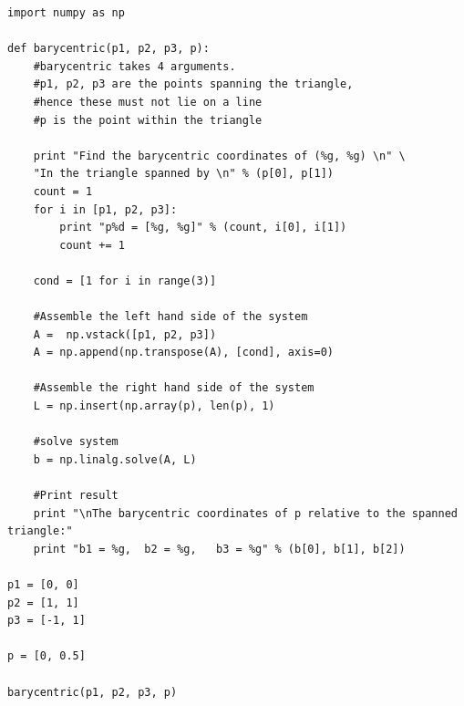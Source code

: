 \documentclass[a4paper,norsk]{article}
\begin{document}
\begin{lstlisting}[style=python]
import numpy as np

def barycentric(p1, p2, p3, p):
    #barycentric takes 4 arguments.
    #p1, p2, p3 are the points spanning the triangle, 
    #hence these must not lie on a line
    #p is the point within the triangle

    print "Find the barycentric coordinates of (%g, %g) \n" \
    "In the triangle spanned by \n" % (p[0], p[1])
    count = 1
    for i in [p1, p2, p3]:
        print "p%d = [%g, %g]" % (count, i[0], i[1])
        count += 1

    cond = [1 for i in range(3)]

    #Assemble the left hand side of the system
    A =  np.vstack([p1, p2, p3])
    A = np.append(np.transpose(A), [cond], axis=0)

    #Assemble the right hand side of the system
    L = np.insert(np.array(p), len(p), 1)

    #solve system
    b = np.linalg.solve(A, L)

    #Print result
    print "\nThe barycentric coordinates of p relative to the spanned triangle:"
    print "b1 = %g,  b2 = %g,   b3 = %g" % (b[0], b[1], b[2])

p1 = [0, 0]
p2 = [1, 1]
p3 = [-1, 1]

p = [0, 0.5]

barycentric(p1, p2, p3, p)
\end{lstlisting}

\newpage
\end{document}
